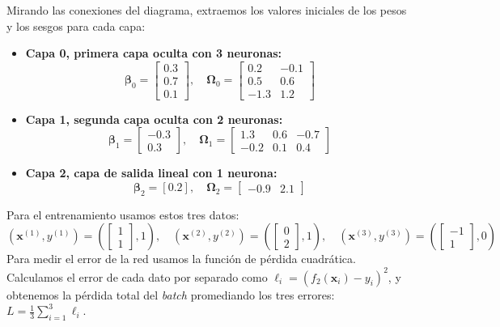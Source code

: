 \documentclass[10pt,a4paper]{article}
\begin{document}
Mirando las conexiones del diagrama, extraemos los valores iniciales de los pesos y los sesgos para cada capa:
\begin{itemize}\itemsep-3pt   
    \item \textbf{Capa 0, primera capa oculta con 3 neuronas:}
    \[
    \boldsymbol{\beta}_0 = \begin{bmatrix} 0.3 \\ 0.7 \\ 0.1 \end{bmatrix}, \quad
    \boldsymbol{\Omega}_0 = \begin{bmatrix} 0.2 & -0.1 \\ 0.5 & 0.6 \\ -1.3 & 1.2 \end{bmatrix}
    \]
    \item \textbf{Capa 1, segunda capa oculta con 2 neuronas:}
    \[
    \boldsymbol{\beta}_1 = \begin{bmatrix} -0.3 \\ 0.3 \end{bmatrix}, \quad
    \boldsymbol{\Omega}_1 = \begin{bmatrix} 1.3 & 0.6 & -0.7 \\ -0.2 & 0.1 & 0.4 \end{bmatrix}
    \]
    \item \textbf{Capa 2, capa de salida lineal con 1 neurona:}
    \[
    \boldsymbol{\beta}_2 = [0.2], \quad
    \boldsymbol{\Omega}_2 = \begin{bmatrix} -0.9 & 2.1 \end{bmatrix}
    \]
\end{itemize}

Para el entrenamiento usamos estos tres datos:
\[
(\mathbf{x}^{(1)}, y^{(1)}) = \left(\begin{bmatrix} 1 \\ 1 \end{bmatrix}, 1\right), \quad
(\mathbf{x}^{(2)}, y^{(2)}) = \left(\begin{bmatrix} 0 \\ 2 \end{bmatrix}, 1\right), \quad
(\mathbf{x}^{(3)}, y^{(3)}) = \left(\begin{bmatrix} -1 \\ 1 \end{bmatrix}, 0\right)
\]
Para medir el error de la red usamos la función de pérdida cuadrática. Calculamos el error de cada dato por separado como $\ell_i = (f_2(\mathbf{x}_i) - y_i)^2$, y obtenemos la pérdida total del \textit{batch} promediando los tres errores: $L = \frac{1}{3} \sum_{i=1}^3 \ell_i$.
\end{document}

